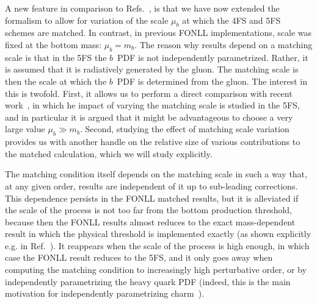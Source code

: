 \documentclass[12pt]{article}
\begin{document}
A new feature  in comparison to
Refs.~\cite{Forte:2015hba,Forte:2016sja},
is that we have now extended the formalism to allow for variation of
the scale $\mu_b$ at which the 4FS and 5FS schemes are matched.
In contrast,  in previous FONLL implementations, scale was fixed at
the  bottom mass:  $\mu_b=m_b$.
The reason why results depend on a matching scale is that in 
the 5FS the $b$~PDF is not independently
parametrized. Rather, it is assumed that it is radiatively generated
by the gluon. The matching scale is then the scale at which the $b$~PDF
is determined from the gluon. 
The interest in this is twofold. First,  it allows us
to perform  a direct comparison with recent work~\cite{Bertone:2017djs},
in which  he impact of varying the matching scale  is studied in the
5FS,  and in particular it is argued  that it might be
advantageous to choose a very large value $\mu_b\gg m_b$. 
Second, studying the effect  of matching scale variation provides us 
with another handle on the relative size of various contributions to
the matched calculation, which we will study explicitly.

The matching condition itself depends on
the matching scale in such a way that, at any given order,  results
are  independent of it up to sub-leading corrections. This dependence
persists in the FONLL matched results, but it is alleviated if the
scale of the process is  not too far from the bottom production
threshold, because then
the FONLL results almost reduces to the exact mass-dependent result in
which the physical threshold is implemented exactly (as shown
explicitly e.g. in Ref.~\cite{Forte:2010ta}). It reappears when
the scale of the process is 
high enough, in which case  the FONLL result reduces to the 5FS, and it
only goes away when computing the matching condition to increasingly
high perturbative order, or by independently parametrizing the heavy
quark PDF (indeed, this is the main motivation for independently
parametrizing charm~\cite{Ball:2016neh,Ball:2017nwa}).
\end{document}
